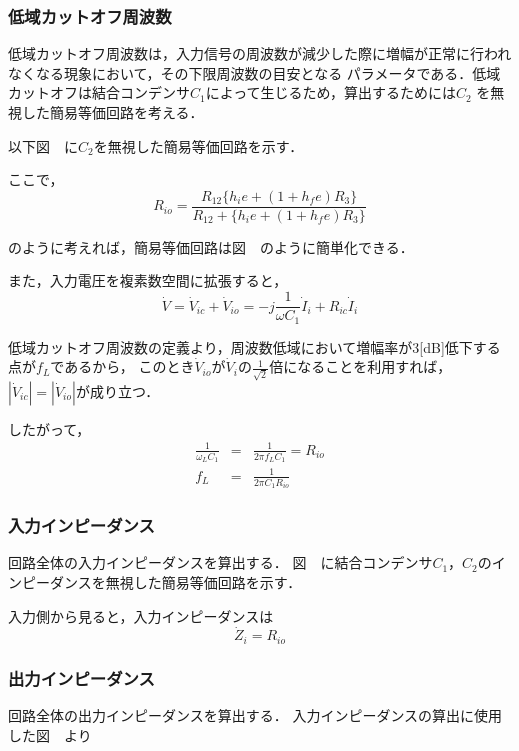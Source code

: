 \documentclass[dvipdfmx,titlepage,a4j]{jsarticle}  %
\begin{document}
\subsubsection{低域カットオフ周波数}
低域カットオフ周波数は，入力信号の周波数が減少した際に増幅が正常に行われなくなる現象において，その下限周波数の目安となる
パラメータである．低域カットオフは結合コンデンサ$C_1$によって生じるため，算出するためには$C_2$
を無視した簡易等価回路を考える．

以下図　に$C_2$を無視した簡易等価回路を示す．

ここで，
\begin{equation}
  R_{io} = \frac{R_{12} \{h_ie + ( 1 + h_fe)R_3\}}{R_{12} + \{h_ie + ( 1 + h_fe)R_3\}}
\end{equation}

のように考えれば，簡易等価回路は図　のように簡単化できる．

また，入力電圧を複素数空間に拡張すると，
\begin{equation}
  \dot{V} = \dot{V}_{ic} + \dot{V}_{io} = -j \frac{1}{\omega C_1} \dot{I}_i + R_{ic} \dot{I}_i
\end{equation}

低域カットオフ周波数の定義より，周波数低域において増幅率が3[dB]低下する点が$f_L$であるから，
このとき$\dot{V}_{io}$が$\dot{V}_{i}$の$\frac{1}{\sqrt{2}}$倍になることを利用すれば，
$\left\lvert \dot{V}_{ic} \right\rvert = \left\lvert \dot{V}_{io} \right\rvert$が成り立つ．

したがって，
\begin{eqnarray}
  \frac{1}{\omega_L C_1} &=& \frac{1}{2 \pi f_L C_1} = R_{io} \\
  f_L &=& \frac{1}{2 \pi C_1 R_{io}}
\end{eqnarray}

\subsubsection{入力インピーダンス}
回路全体の入力インピーダンスを算出する．
図　に結合コンデンサ$C_1$，$C_2$のインピーダンスを無視した簡易等価回路を示す．

入力側から見ると，入力インピーダンスは
\begin{equation}
  \dot{Z}_i = R_{io}
\end{equation}

\subsubsection{出力インピーダンス}
回路全体の出力インピーダンスを算出する．
入力インピーダンスの算出に使用した図　より
\end{document}
